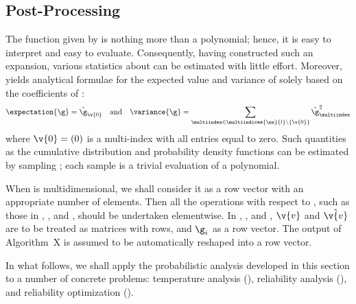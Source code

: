 \subsection{Post-Processing}

The function given by  is nothing more than a
polynomial; hence, it is easy to interpret and easy to evaluate. Consequently,
having constructed such an expansion, various statistics about \g can be
estimated with little effort. Moreover,  yields
analytical formulae for the expected value and variance of \g solely based on
the coefficients of :
\[
  \expectation{\g} = \hat{\g}_{\v{0}} \hspace{1em} \text{and} \hspace{1em}
  \variance{\g} = \sum_{\multiindex \in \multiindices{\nz}{l} \setminus \{ \v{0} \}} \hat{\g}_{\multiindex}^2
\]
where $\v{0} = (0)$ is a multi-index with all entries equal to zero. Such
quantities as the cumulative distribution and probability density functions can
be estimated by sampling ; each sample is a trivial
evaluation of a polynomial.

\begin{remark}
When \g is multidimensional, we shall consider it as a row vector with an
appropriate number of elements. Then all the operations with respect to \g, such
as those in , , and
, should be undertaken elementwise. In
, , and
, $\v{v}$ and $\hat{\v{v}}$ are to be treated as
matrices with \nc rows, and $\g_i$ as a row vector. The output of Algorithm~X is
assumed to be automatically reshaped into a row vector.
\end{remark}

In what follows, we shall apply the probabilistic analysis developed in this
section to a number of concrete problems: temperature analysis
(), reliability analysis
(), and reliability optimization
().
